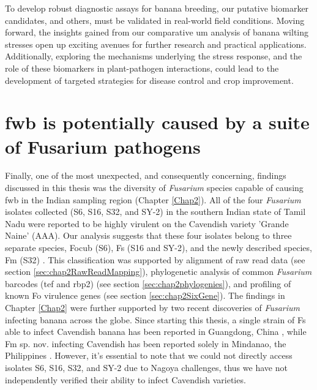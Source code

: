 To develop robust diagnostic assays for banana breeding, our putative biomarker candidates, and others, must be validated in real-world field conditions. Moving forward, the insights gained from our comparative \ac{um} analysis of banana wilting stresses open up exciting avenues for further research and practical applications. Additionally, exploring the mechanisms underlying the stress response, and the role of these biomarkers in plant-pathogen interactions, could lead to the development of targeted strategies for disease control and crop improvement.

\section{\Acl{fwb} is potentially caused by a suite of Fusarium pathogens}

Finally, one of the most unexpected, and consequently concerning, findings discussed in this thesis was the diversity of \textit{Fusarium} species capable of causing \ac{fwb} in the Indian sampling region (Chapter \ref{Chap2}). All of the four \textit{Fusarium} isolates collected (S6, S16, S32, and SY-2) in the southern Indian state of Tamil Nadu were reported to be highly virulent on the Cavendish variety 'Grande Naine' (AAA). Our analysis suggests that these four isolates belong to three separate species, \acf{Focub} (S6), \acf{Fs} (S16 and SY-2), and the newly described species, \acf{Fm} (S32) \parencite{Nozawa2023}. This classification was supported by alignment of raw read data (see section \ref{sec:chap2RawReadMapping}), phylogenetic analysis of common \textit{Fusarium} barcodes (\ac{tef} and \ac{rbp2}) (see section \ref{sec:chap2phylogenies}), and profiling of known \ac{Fo} virulence genes (see section \ref{sec:chap2SixGene}). The findings in Chapter \ref{Chap2} were further supported by two recent discoveries of \textit{Fusarium} infecting banana across the globe. Since starting this thesis, a single strain of \ac{Fs} able to infect Cavendish banana has been reported in Guangdong, China \parencite{Cui2021}, while \ac{Fm} sp. nov. infecting Cavendish has been reported solely in Mindanao, the Philippines \parencite{Nozawa2023}. However, it's essential to note that we could not directly access isolates S6, S16, S32, and SY-2 due to Nagoya challenges, thus we have not independently verified their ability to infect Cavendish varieties.

